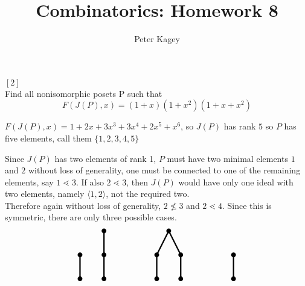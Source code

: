 \documentclass{article}
\newenvironment{problem}[2][Problem]{\begin{trivlist}
\item[\hskip \labelsep {\bfseries #1}\hskip \labelsep {\bfseries #2.}]}{\end{trivlist}}
\newenvironment{solution}[1][Solution.]{\begin{trivlist}
\item[\hskip \labelsep {\bfseries #1}]}{\end{trivlist}}
\begin{document}
\title{Combinatorics: Homework 8}
\author{Peter Kagey}

\maketitle

\begin{problem}{34} $[2]$ \\
  Find all nonisomorphic posets P such that \[
    F(J(P), x) = (1 + x)(1 + x^2)(1 + x + x^2)
  \]
\end{problem}

\begin{solution}
  $F(J(P), x) = 1 + 2x + 3x^3 + 3x^4 + 2x^5 + x^6$, so $J(P)$ has rank $5$ so
  $P$ has five elements, call them $\{1,2,3,4,5\}$

  Since $J(P)$ has two elements of rank 1, $P$ must have two minimal elements
  $1$ and $2$ without loss of generality, one must be connected to one of the
  remaining elements, say $1 \lessdot 3$. If also $2 \lessdot 3$, then $J(P)$
  would have only one ideal with two elements, namely $\langle 1, 2 \rangle$, not
  the required two.
  \\
  Therefore again without loss of generality, $2 \not\leq 3$ and $2 \lessdot 4$.
  Since this is symmetric, there are only three possible cases.
  \[
    \begin{tikzpicture}
      \fill (0,0) circle (0.1);
      \fill (0,1) circle (0.1);
      \draw[ultra thick] (0,0)--(0,1);

      \fill (1,0) circle (0.1);
      \fill (1,1) circle (0.1);
      \fill (1,2) circle (0.1);
      \draw[ultra thick] (1,0)--(1,2);
    \end{tikzpicture}
    \hspace{2cm}
    \begin{tikzpicture}
      \fill (0,0) circle (0.1);
      \fill (0,1) circle (0.1);
      \draw[ultra thick] (0,0)--(0,1);

      \fill (1,0) circle (0.1);
      \fill (1,1) circle (0.1);
      \draw[ultra thick] (1,0)--(1,1);

      \fill (1/2,2) circle (0.1);
      \draw[ultra thick] (1,1)--(1/2,2)--(0,1);
    \end{tikzpicture}
    \hspace{2cm}
    \begin{tikzpicture}
      \fill (0,0) circle (0.1);
      \fill (0,1) circle (0.1);
      \draw[ultra thick] (0,0)--(0,1);


\end{tikzpicture}\]
\end{solution}
\end{document}
